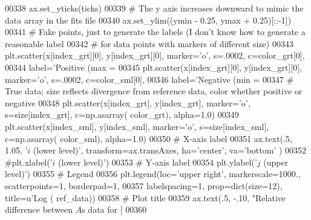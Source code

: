 \begin{DoxyCode}
{{{00338                     ax.set\_yticks(ticks)
00339                     \textcolor{comment}{# The y axis increases downward to mimic the data array in the fits file}
00340                     ax.set\_ylim((ymin - 0.25, ymax + 0.25)[::-1])
00341                     \textcolor{comment}{# Fake points, just to generate the labels (I don't know how to generate a reasonable
       label}
00342                     \textcolor{comment}{# for data points with markers of different size)}
00343                     plt.scatter(x[index\_grt][0], y[index\_grt][0], marker=\textcolor{stringliteral}{'o'}, s=.0002, c=color\_grt[0],
00344                                 label=\textcolor{stringliteral}{'Positive (max = %
00345                     plt.scatter(x[index\_grt][0], y[index\_grt][0], marker=\textcolor{stringliteral}{'o'}, s=.0002, c=color\_sml[0],
00346                                 label=\textcolor{stringliteral}{'Negative (min = %
00347                     \textcolor{comment}{# True data; size reflects divergence from reference data, color whether positive or
       negative}
00348                     plt.scatter(x[index\_grt], y[index\_grt], marker=\textcolor{stringliteral}{'o'}, s=size[index\_grt], c=np.asarray(
      color\_grt), alpha=1.0)
00349                     plt.scatter(x[index\_sml], y[index\_sml], marker=\textcolor{stringliteral}{'o'}, s=size[index\_sml], c=np.asarray(
      color\_sml), alpha=1.0)
00350                     \textcolor{comment}{# X-axis label }
00351                     ax.text(.5, 1.05, \textcolor{stringliteral}{'$i$ (lower level)'}, transform=ax.transAxes, ha=\textcolor{stringliteral}{'center'}, va=\textcolor{stringliteral}{'bottom'}
      )
00352                     \textcolor{comment}{#plt.xlabel('$i$ (lower level)')}
00353                     \textcolor{comment}{# Y-axis label}
00354                     plt.ylabel(\textcolor{stringliteral}{'$j$ (upper level)'})
00355                     \textcolor{comment}{# Legend}
00356                     plt.legend(loc=\textcolor{stringliteral}{'upper right'}, markerscale=1000., scatterpoints=1, borderpad=1,
00357                                labelspacing=1, prop=dict(size=12), title=\textcolor{stringliteral}{u'Log (%
      ref\_data))
00358                     \textcolor{comment}{# Plot title}
00359                     ax.text(.5, -.10, \textcolor{stringliteral}{"Relative difference between $A$s data for [%
00360                                 %
}}}}}}}
\end{DoxyCode}
